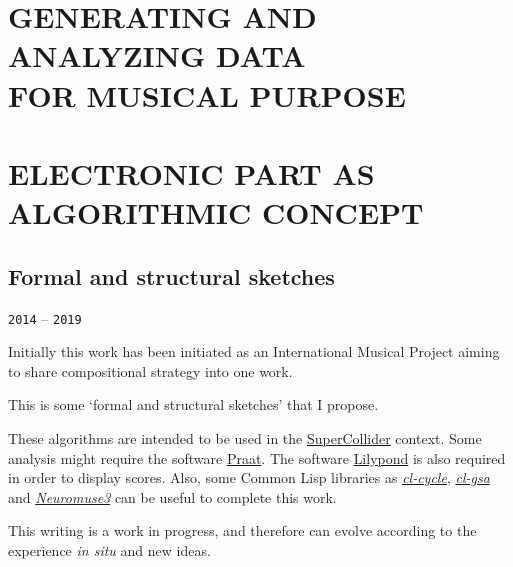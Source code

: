 \documentclass{book}
\begin{document}
\part[Generating and analyzing data for musical purpose]{GENERATING AND ANALYZING DATA\\ FOR MUSICAL PURPOSE}
\thispagestyle{empty}

\mainmatter







\part[Electronic part as algorithmic concept]{ELECTRONIC PART AS ALGORITHMIC CONCEPT}

 \chapter[Formal and structural sketches]{\huge Formal and structural sketches}
 \thispagestyle{empty}

\label{fss}
{\texttt{2014} -- \texttt{2019}}

\bigskip
\smallskip
\bigskip

Initially  this work has been initiated  as an International Musical Project aiming to share compositional strategy into one work. 

This is some `formal and structural sketches' that I propose.

\bigskip

These algorithms are intended to be used in the \href{http://supercollider.github.io}{SuperCollider} context. Some analysis might require the software \href{http://www.fon.hum.uva.nl/praat}{Praat}. The software \href{http://lilypond.org/}{Lilypond} is also required in order to display scores. Also, some Common Lisp libraries as \href{https://github.com/yannics/cl-cycle}{\textsl{cl-cycle}}, \href{https://github.com/yannics/cl-gsa}{\textsl{cl-gsa}} and \href{https://bitbucket.org/yann\_ics/neuromuse3}{\textsl{Neuromuse3}} can be useful to complete this work.

\bigskip

This writing is a work in progress, and therefore can evolve according to the experience \textit{in situ} and new ideas. 

\smallskip
\end{document}
